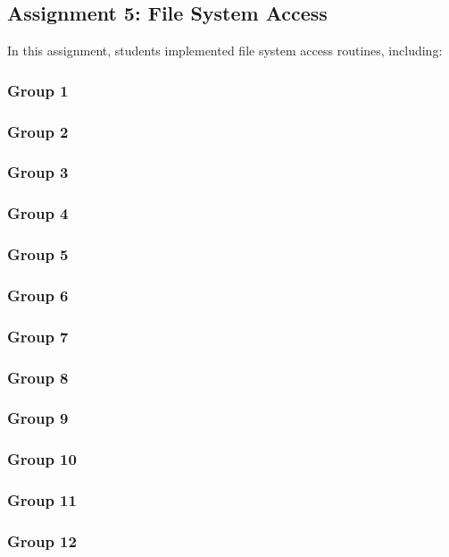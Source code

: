 \documentclass[12pt]{article}
\begin{document}
\subsection{Assignment 5: File System Access}
In this assignment, students implemented file system access routines, including:

\subsubsection{Group 1}
\subsubsection{Group 2}
\subsubsection{Group 3}
\subsubsection{Group 4}
\subsubsection{Group 5}
\subsubsection{Group 6}
\subsubsection{Group 7}
\subsubsection{Group 8}
\subsubsection{Group 9}
\subsubsection{Group 10}
\subsubsection{Group 11}
\subsubsection{Group 12}
\end{document}
